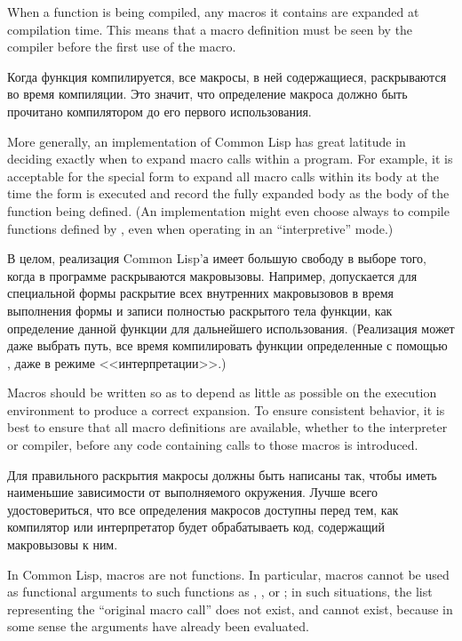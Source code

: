 When a function is being compiled, any macros it contains are expanded
at compilation time.  This means that a macro definition must be seen by the
compiler before the first use of the macro.

Когда функция компилируется, все макросы, в ней содержащиеся, раскрываются во
время компиляции. Это значит, что определение макроса должно быть прочитано
компилятором до его первого использования.

More generally, an implementation of Common Lisp has great latitude in deciding
exactly when to expand macro calls within a program.  For example,
it is acceptable for the  special form to expand all macro
calls within its body at the time the  form is executed
and record the fully expanded body as the body of the function
being defined.
(An implementation might even choose always to compile functions defined
by , even when operating in an ``interpretive'' mode.)

В целом, реализация Common Lisp'а имеет большую свободу в выборе того, когда в
программе раскрываются макровызовы.
Например, допускается для специальной формы  раскрытие всех
внутренних макровызовов в время выполнения формы  и записи полностью
раскрытого тела функции, как определение данной функции для дальнейшего
использования.
(Реализация может даже выбрать путь, все время компилировать функции
определенные с помощью , даже в режиме <<интерпретации>>.)

Macros should be written so as to depend as little as possible
on the execution environment to produce a correct expansion.  To ensure
consistent behavior, it is best to ensure that all macro definitions are
available, whether to the interpreter or compiler, before any code
containing calls to those macros is introduced.

Для правильного раскрытия макросы должны быть написаны так, чтобы иметь
наименьшие зависимости от выполняемого окружения. Лучше всего удостовериться,
что все определения макросов доступны перед тем, как компилятор или
интерпретатор будет обрабатываеть код, содержащий макровызовы к ним. 

In Common Lisp, macros are not functions.
In particular, macros cannot be used as
functional arguments to such functions as , ,
or ; in such situations, the list representing the ``original macro
call'' does not exist, and cannot exist, because in some sense the arguments
have already been evaluated.

